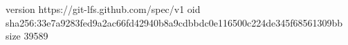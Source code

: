 version https://git-lfs.github.com/spec/v1
oid sha256:33e7a9283fed9a2ac66fd42940b8a9cdbbdc0e116500c224de345f68561309bb
size 39589
